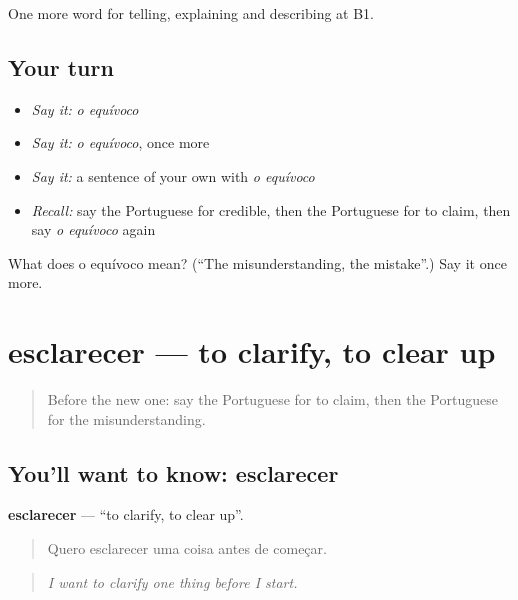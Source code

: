 \begin{grammarlens}[title={What you've built}]
One more word for telling, explaining and describing at B1.
\end{grammarlens}

\subsection*{Your turn}
\begin{itemize}
\raggedright
  \item \emph{Say it:} \emph{o equívoco}
  \item \emph{Say it:} \emph{o equívoco}, once more
  \item \emph{Say it:} a sentence of your own with \emph{o equívoco}
  \item \emph{Recall:} say the Portuguese for credible, then the Portuguese for to claim, then say \emph{o equívoco} again
\end{itemize}

\begin{tcolorbox}[breakable,colback=teal!4,colframe=teal!35!black,title={Before you move on}]
What does o equívoco mean? (\textquotedblleft{}The misunderstanding, the mistake\textquotedblright{}.) Say it once more.
\end{tcolorbox}
\section[esclarecer]{esclarecer — to clarify, to clear up}

\label{lesson:PT-C343-esclarecer}



\begin{quote}
Before the new one: say the Portuguese for to claim, then the Portuguese for the misunderstanding.
\end{quote}

\subsection*{You'll want to know: esclarecer}
\textbf{esclarecer} — \textquotedblleft{}to clarify, to clear up\textquotedblright{}.

\begin{quote}
Quero esclarecer uma coisa antes de começar.
\end{quote}

\begin{quote}
\emph{I want to clarify one thing before I start.}
\end{quote}

